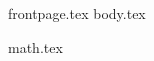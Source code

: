 \documentclass[runningheads]{llncs}
\begin{document}
{frontpage.tex}
{body.tex}

\iflncs
  
\fi
\ifoakland
  
\fi
\ifccs
  
\fi


\appendix

{math.tex}
\end{document}
